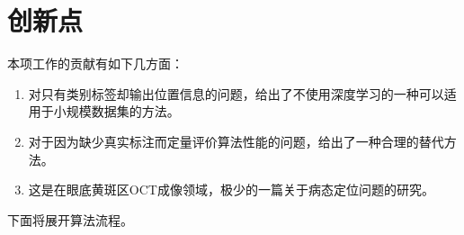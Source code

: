 \section{创新点}
    本项工作的贡献有如下几方面：
    \begin{enumerate}
        \item 对只有类别标签却输出位置信息的问题，给出了不使用深度学习的一种可以适用于小规模数据集的方法。
        \item 对于因为缺少真实标注而定量评价算法性能的问题，给出了一种合理的替代方法。
        \item 这是在眼底黄斑区OCT成像领域，极少的一篇关于病态定位问题的研究。
    \end{enumerate}

    下面将展开算法流程。